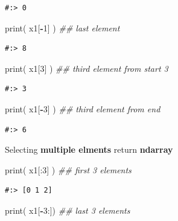 \documentclass[
]{book}
\newenvironment{Shaded}{\begin{snugshade}}{\end{snugshade}}
\newcommand{\BuiltInTok}[1]{#1}
\newcommand{\CommentTok}[1]{\textcolor[rgb]{0.37,0.37,0.37}{\textit{#1}}}
\newcommand{\DecValTok}[1]{\textcolor[rgb]{0.06,0.06,0.06}{#1}}
\newcommand{\NormalTok}[1]{#1}
\newcommand{\OperatorTok}[1]{\textcolor[rgb]{0.43,0.43,0.43}{\textbf{#1}}}
\begin{document}
\begin{verbatim}
#:> 0
\end{verbatim}

\begin{Shaded}
\begin{Highlighting}[]
\BuiltInTok{print}\NormalTok{( x1[}\OperatorTok{-}\DecValTok{1}\NormalTok{]  )  }\CommentTok{## last element}
\end{Highlighting}
\end{Shaded}

\begin{verbatim}
#:> 8
\end{verbatim}

\begin{Shaded}
\begin{Highlighting}[]
\BuiltInTok{print}\NormalTok{( x1[}\DecValTok{3}\NormalTok{]   )  }\CommentTok{## third element from start 3}
\end{Highlighting}
\end{Shaded}

\begin{verbatim}
#:> 3
\end{verbatim}

\begin{Shaded}
\begin{Highlighting}[]
\BuiltInTok{print}\NormalTok{( x1[}\OperatorTok{-}\DecValTok{3}\NormalTok{]  )  }\CommentTok{## third element from end}
\end{Highlighting}
\end{Shaded}

\begin{verbatim}
#:> 6
\end{verbatim}

Selecting \textbf{multiple elments} return \textbf{ndarray}

\begin{Shaded}
\begin{Highlighting}[]
\BuiltInTok{print}\NormalTok{( x1[:}\DecValTok{3}\NormalTok{]  )  }\CommentTok{## first 3 elements}
\end{Highlighting}
\end{Shaded}

\begin{verbatim}
#:> [0 1 2]
\end{verbatim}

\begin{Shaded}
\begin{Highlighting}[]
\BuiltInTok{print}\NormalTok{( x1[}\OperatorTok{-}\DecValTok{3}\NormalTok{:])   }\CommentTok{## last 3 elements}
\end{Highlighting}
\end{Shaded}
\end{document}
